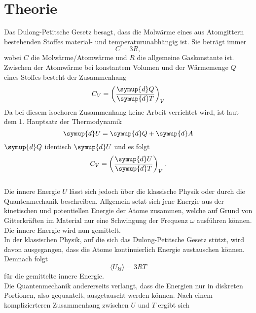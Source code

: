 \section{Theorie}
\label{sec:Theorie}
Das Dulong-Petitsche Gesetz besagt, dass die Molwärme eines aus Atomgittern bestehenden Stoffes material- und temperaturunabhängig ist.
Sie beträgt immer
\begin{equation}
  C = 3R,
  \label{eqn:1}
\end{equation}
wobei $C$ die Molwärme/Atomwärme und $R$ die allgemeine Gaskonstante ist.
Zwischen der Atomwärme bei konstantem Volumen und der Wärmemenge $Q$ eines Stoffes besteht der Zusammenhang
\begin{equation}
  C_V = \left(\frac{\symup{d}Q}{\symup{d}T}\right)_V
\end{equation}
Da bei diesem isochoren Zusammenhang keine Arbeit verrichtet wird, ist laut dem 1. Hauptsatz der Thermodynamik
\begin{equation}
  \symup{d}U = \symup{d}Q + \symup{d}A
  \label{eqn:2}
\end{equation}
$\symup{d}Q$ identisch $\symup{d}U$ und es folgt
\begin{equation}
  C_V = \left(\frac{\symup{d}U}{\symup{d}T}\right)_V.
\end{equation}\\
Die innere Energie $U$ lässt sich jedoch über die klassische Physik oder durch die Quantenmechanik beschreiben.
Allgemein setzt sich jene Energie aus der kinetischen und potentiellen Energie der Atome zusammen, welche auf Grund von Gitterkräften im Material nur eine Schwingung der Frequenz $\omega$ ausführen können.
Die innere Energie wird nun gemittelt.\\
In der klassischen Physik, auf die sich das Dulong-Petitsche Gesetz stützt, wird davon ausgegangen, dass die Atome kontinuierlich Energie austauschen können.
Demnach folgt
\begin{equation}
  \langle U_{kl} \rangle = 3RT
  \label{eqn:3}
\end{equation}
für die gemittelte innere Energie.\\
Die Quantenmechanik andererseits verlangt, dass die Energien nur in diskreten Portionen, also gequantelt, ausgetauscht werden können.
Nach einem komplizierteren Zusammenhang zwischen $U$ und $T$ ergibt sich
